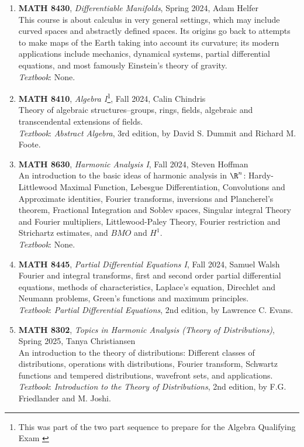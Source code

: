 \documentclass{article}
\begin{document}
\begin{enumerate}[leftmargin=0in]
    \item[] \textbf{MATH 8430}, \textit{Differentiable Manifolds}, Spring 2024, Adam Helfer\\
    This course is about calculus in very general settings, which may include curved spaces and abstractly defined spaces. Its origins go back to attempts to make maps of the Earth taking into account its curvature; its modern applications include mechanics, dynamical systems, partial differential equations, and most famously Einstein's theory of gravity. \\
    \textit{Textbook}: None. 

    \item[] \textbf{MATH 8410}, \textit{Algebra I}\footnote{This was part of the two part sequence to prepare for the Algebra Qualifying Exam \label{Algebra Qual}}, Fall 2024, Calin Chindris\\
    Theory of algebraic structures--groups, rings, fields, algebraic and transcendental extensions of fields. \\
    \textit{Textbook}: \textit{Abstract Algebra}, 3rd edition, by David S. Dummit and Richard M. Foote. 
    
    \item[] \textbf{MATH 8630}, \textit{Harmonic Analysis I}, Fall 2024, Steven Hoffman \\
    An introduction to the basic ideas of harmonic analysis in $\R^n$: Hardy-Littlewood Maximal Function, Lebesgue Differentiation, Convolutions and Approximate identities, Fourier transforms, inversions and Plancherel's theorem, Fractional Integration and Soblev spaces, Singular integral Theory and Fourier multipliers, Littlewood-Paley Theory, Fourier restriction and Strichartz estimates, and $BMO$ and $H^1$.\\
    \textit{Textbook}: None.  

    \item[] \textbf{MATH 8445}, \textit{Partial Differential Equations I}, Fall 2024, Samuel Walsh\\
    Fourier and integral transforms, first and second order partial differential equations, methods of characteristics, Laplace's equation, Direchlet and Neumann problems, Green's functions and maximum principles. \\
    \textit{Textbook}: \textit{Partial Differential Equations}, 2nd edition, by Lawrence C. Evans. 

    \item[] \textbf{MATH 8302}, \textit{Topics in Harmonic Analysis (Theory of Distributions)}, Spring 2025, Tanya Christiansen\\
    An introduction to the theory of distributions: Different classes of distributions, operations with distributions, Fourier transform, Schwartz functions and tempered distributions, wavefront sets, and applications. \\
    \textit{Textbook}: \textit{Introduction to the Theory of Distributions}, 2nd edition, by F.G. Friedlander and M. Joshi.
    

\end{enumerate}
\end{document}
